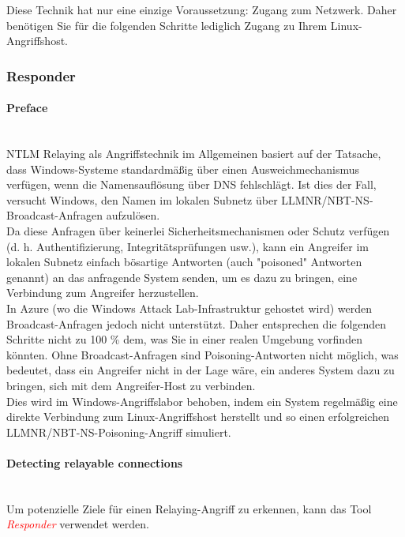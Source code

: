 Diese Technik hat nur eine einzige Voraussetzung: Zugang zum Netzwerk. Daher benötigen Sie für die folgenden Schritte lediglich Zugang zu Ihrem Linux-Angriffshost.

\subsubsection{Responder}

\paragraph{Preface}\mbox{} \\
NTLM Relaying als Angriffstechnik im Allgemeinen basiert auf der Tatsache, dass Windows-Systeme standardmäßig über einen Ausweichmechanismus verfügen, wenn die Namensauflösung über DNS fehlschlägt. Ist dies der Fall, versucht Windows, den Namen im lokalen Subnetz über LLMNR/NBT-NS-Broadcast-Anfragen aufzulösen.\\

Da diese Anfragen über keinerlei Sicherheitsmechanismen oder Schutz verfügen (d. h. Authentifizierung, Integritätsprüfungen usw.), kann ein Angreifer im lokalen Subnetz einfach bösartige Antworten (auch "poisoned" Antworten genannt) an das anfragende System senden, um es dazu zu bringen, eine Verbindung zum Angreifer herzustellen.\\

In Azure (wo die Windows Attack Lab-Infrastruktur gehostet wird) werden Broadcast-Anfragen jedoch nicht unterstützt. Daher entsprechen die folgenden Schritte nicht zu 100 \% dem, was Sie in einer realen Umgebung vorfinden könnten. Ohne Broadcast-Anfragen sind Poisoning-Antworten nicht möglich, was bedeutet, dass ein Angreifer nicht in der Lage wäre, ein anderes System dazu zu bringen, sich mit dem Angreifer-Host zu verbinden.\\

Dies wird im Windows-Angriffslabor behoben, indem ein System regelmäßig eine direkte Verbindung zum Linux-Angriffshost herstellt und so einen erfolgreichen LLMNR/NBT-NS-Poisoning-Angriff simuliert.

\paragraph{Detecting relayable connections}\mbox{} \\
Um potenzielle Ziele für einen Relaying-Angriff zu erkennen, kann das Tool \textcolor{red}{\textit{Responder}} verwendet werden.

